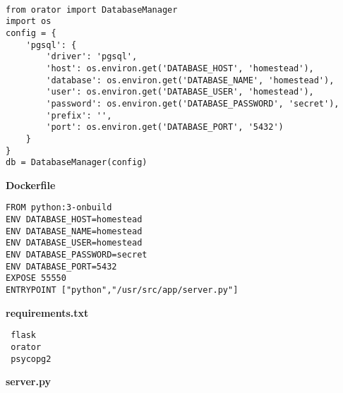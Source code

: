 \begin{mdframed}[linecolor=black, topline=true, bottomline=true,
  leftline=false, rightline=false, backgroundcolor=LightGray,userdefinedwidth=\textwidth]
  \begin{verbatim}

from orator import DatabaseManager
import os
config = {
    'pgsql': {
        'driver': 'pgsql',
        'host': os.environ.get('DATABASE_HOST', 'homestead'),
        'database': os.environ.get('DATABASE_NAME', 'homestead'),
        'user': os.environ.get('DATABASE_USER', 'homestead'),
        'password': os.environ.get('DATABASE_PASSWORD', 'secret'),
        'prefix': '',
        'port': os.environ.get('DATABASE_PORT', '5432')
    }
}
db = DatabaseManager(config)

\end{verbatim}
\end{mdframed}
\vspace{0.2cm}
{ \sffamily 
\textbf{Dockerfile}
}\vspace{0.1cm}


\begin{mdframed}[linecolor=black, topline=true, bottomline=true,
  leftline=false, rightline=false, backgroundcolor=LightGray,userdefinedwidth=\textwidth]
  \begin{verbatim}
FROM python:3-onbuild
ENV DATABASE_HOST=homestead
ENV DATABASE_NAME=homestead
ENV DATABASE_USER=homestead
ENV DATABASE_PASSWORD=secret
ENV DATABASE_PORT=5432
EXPOSE 55550
ENTRYPOINT ["python","/usr/src/app/server.py"]
\end{verbatim}
\end{mdframed}

{ \sffamily 
\textbf{requirements.txt}
}
\begin{mdframed}[linecolor=black, topline=true, bottomline=true,
  leftline=false, rightline=false, backgroundcolor=LightGray,userdefinedwidth=\textwidth]
  \begin{verbatim}
 flask
 orator
 psycopg2
\end{verbatim}
\end{mdframed}

\pagebreak
{ \sffamily \textbf{server.py} }


